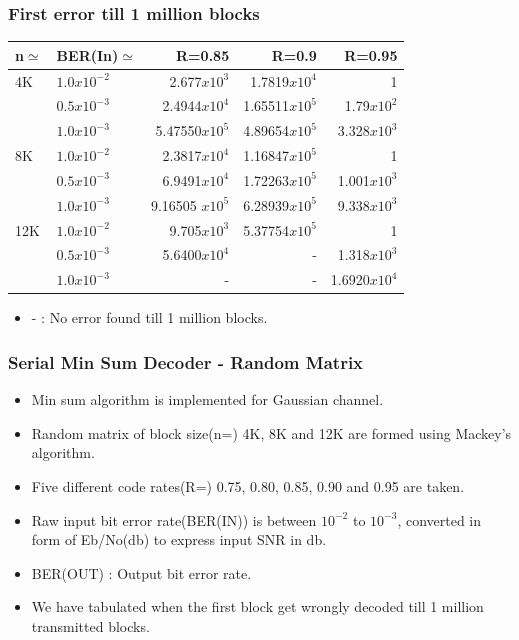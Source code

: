 \documentclass[xcolor=dvipsname]
{beamer}
\begin{document}
\begin{frame}[t] 
\frametitle{First error till 1 million blocks}

\begin{table}[]
\centering
\begin{tabular}{|l|l|r|r|r|}
\hline
n$\simeq$   & BER(In)$\simeq$  & R=0.85  & R=0.9 & R=0.95 \\ \hline
4K  & $1.0x10^{-2}$    &2.677$x10^{3}$           &1.7819$x10^{4}$       &1       \\ 
    & $0.5x10^{-3}$    &2.4944$x10^{4}$          &1.65511$x10^{5}$		&1.79$x10^{2}$   \\ 
    & $1.0x10^{-3}$    &5.47550$x10^{5}$         &4.89654$x10^{5}$     &3.328$x10^{3}$ \\ \hline
8K  & $1.0x10^{-2}$    &2.3817$x10^{4}$          &1.16847$x10^{5}$        &1   \\ 
    & $0.5x10^{-3}$    &6.9491$x10^{4}$          &1.72263$x10^{5}$        &1.001$x10^{3}$  \\ 
    & $1.0x10^{-3}$    &9.16505 $x10^{5}$        &6.28939$x10^{5}$       &9.338$x10^{3}$           \\ \hline
12K & $1.0x10^{-2}$    &9.705$x10^{3}$          &5.37754$x10^{5}$       	&1       \\
    & $0.5x10^{-3}$    &5.6400$x10^{4}$          &-     			 		&1.318$x10^{3}$             \\ 
    & $1.0x10^{-3}$    &- 			             &-    					 &1.6920$x10^{4}$   \\ \hline 
\end{tabular}
\end{table}
\begin{itemize}
\item -	 : No error found till 1 million blocks. 
\end{itemize}
\end{frame}

\begin{frame}[t]
\frametitle{ Serial Min Sum Decoder - Random Matrix }

\begin{itemize}
\item Min sum algorithm is implemented for Gaussian channel. 
\item Random matrix of block size(n=) 4K, 8K and 12K  are formed using Mackey's algorithm.
\item Five different code rates(R=) 0.75, 0.80, 0.85, 0.90 and 0.95 are taken.
\item Raw input bit error rate(BER(IN)) is between $10^{-2}$ to $10^{-3}$, converted in form of Eb/No(db) to express input SNR in db. 
\item BER(OUT) : Output bit error rate.
\item We have tabulated when the first block get wrongly decoded till 1 million transmitted blocks.
\end{itemize}
\end{frame}	
\end{document}
